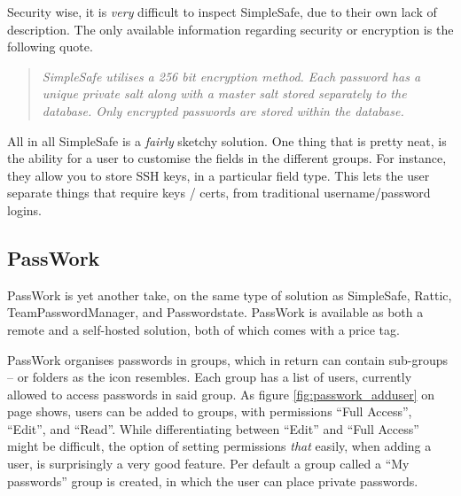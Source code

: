 			Security wise, it is \emph{very} difficult to inspect SimpleSafe, due to their own lack of description. The only available information regarding security or encryption is the following quote.
			\begin{quote}
				\emph{SimpleSafe utilises a 256 bit encryption method. Each password has a unique private salt along with a master salt stored separately to the database. Only encrypted passwords are stored within the database.}\cite{simplesafe_faq}
			\end{quote}

			All in all SimpleSafe is a \emph{fairly} sketchy solution. One thing that is pretty neat, is the ability for a user to customise the fields in the different groups. For instance, they allow you to store SSH keys, in a particular field type. This lets the user separate things that require keys / certs, from traditional username/password logins.

		\subsection*{PassWork}
			PassWork\cite{passwork} is yet another take, on the same type of solution as SimpleSafe, Rattic, TeamPasswordManager, and Passwordstate. PassWork is available as both a remote and a self-hosted solution, both of which comes with a price tag. 

			PassWork organises passwords in groups, which in return can contain sub-groups -- or folders as the icon resembles. Each group has a list of users, currently allowed to access passwords in said group. As figure \ref{fig:passwork_adduser} on page \pageref{fig:passwork_adduser} shows, users can be added to groups, with permissions ``Full Access'', ``Edit'', and ``Read''. While differentiating between ``Edit'' and ``Full Access'' might be difficult, the option of setting permissions \emph{that} easily, when adding a user, is surprisingly a very good feature. Per default a group called a ``My passwords'' group is created, in which the user can place private passwords. 

